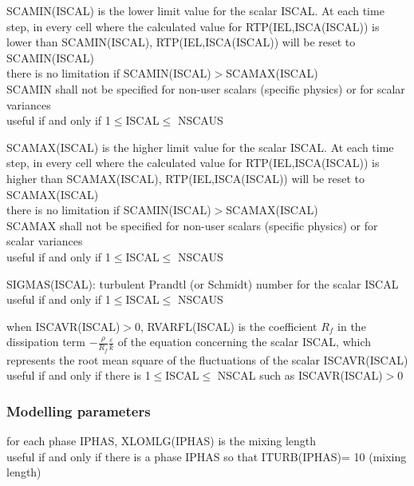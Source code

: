 {SCAMIN(ISCAL) is the lower limit value for the scalar ISCAL. At each time step,
in every cell where the calculated value for RTP(IEL,ISCA(ISCAL)) is lower than
\mbox{SCAMIN(ISCAL)}, RTP(IEL,ISCA(ISCAL)) will be reset to
\mbox{SCAMIN(ISCAL)}\\
there is no limitation if SCAMIN(ISCAL)$>$SCAMAX(ISCAL)\\
SCAMIN shall not be specified for non-user scalars (specific physics) or for
scalar variances\\
useful if and only if 1$\leqslant$ISCAL$\leqslant$ NSCAUS}

{SCAMAX(ISCAL) is the higher limit value for the scalar ISCAL. At each time step,
in every cell where the calculated value for RTP(IEL,ISCA(ISCAL)) is higher than
\mbox{SCAMAX(ISCAL)}, RTP(IEL,ISCA(ISCAL)) will be reset to
\mbox{SCAMAX(ISCAL)}\\
there is no limitation if SCAMIN(ISCAL)$>$SCAMAX(ISCAL)\\
SCAMAX shall not be specified for non-user scalars (specific physics) or for
scalar variances\\
useful if and only if 1$\leqslant$ISCAL$\leqslant$ NSCAUS}

{SIGMAS(ISCAL): turbulent Prandtl (or Schmidt) number for the scalar ISCAL\\
useful if and only if  1$\leqslant$ISCAL$\leqslant$ NSCAUS}

{when ISCAVR(ISCAL)$>$0, RVARFL(ISCAL) is the coefficient $R_f$ in the
dissipation term $\displaystyle -\frac{\rho}{R_f}\frac{\varepsilon}{k}$
of the equation concerning the scalar ISCAL,
which represents the root mean square of the
fluctuations of the scalar ISCAVR(ISCAL)\\
useful if and only if there is 1$\leqslant$ISCAL$\leqslant$ NSCAL such as
 ISCAVR(ISCAL)$>$0} 


\subsubsection{Modelling parameters}

{for each phase IPHAS, XLOMLG(IPHAS) is the mixing length\\
useful if and only if there is a phase IPHAS so that ITURB(IPHAS)= 10 
(mixing length)}

